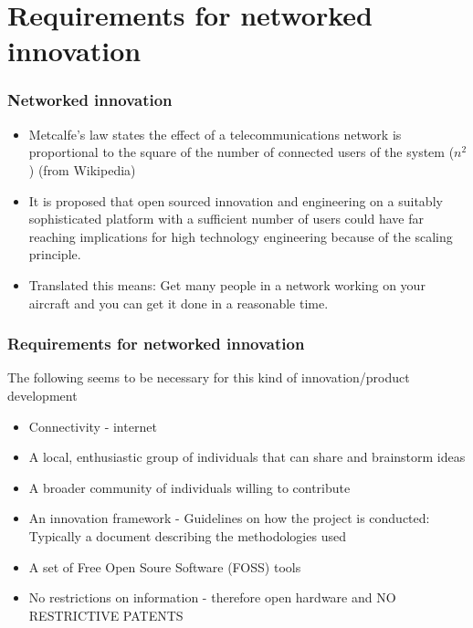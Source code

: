 \documentclass{beamer}
\begin{document}
\section{Requirements for networked innovation} 

\begin{frame}
\frametitle{Networked innovation}

\begin{itemize}
\item Metcalfe's law states the effect of a telecommunications network is proportional to the square of the number of connected users of the system ($n^2$) (from Wikipedia)
\item It is proposed that open sourced innovation and engineering on a suitably sophisticated platform with a sufficient number of users could have far reaching implications for high technology engineering because of the scaling principle.
\item Translated this means:  Get many people in a network working on your aircraft and you can get it done in a reasonable time.        
\end{itemize}

\end{frame}



\begin{frame}
\frametitle{Requirements for networked innovation}

The following seems to be necessary for this kind of innovation/product development

\begin{itemize}
\item Connectivity - internet
\item A local, enthusiastic group of individuals that can share and brainstorm ideas %
\item A broader community of individuals willing to contribute
\item An innovation framework - Guidelines on how the project is conducted:  Typically a document describing the methodologies used
\item A set of Free Open Soure Software (FOSS) tools
\item No restrictions on information - therefore open hardware and NO RESTRICTIVE PATENTS
\end{itemize}
\end{frame}
\end{document}
